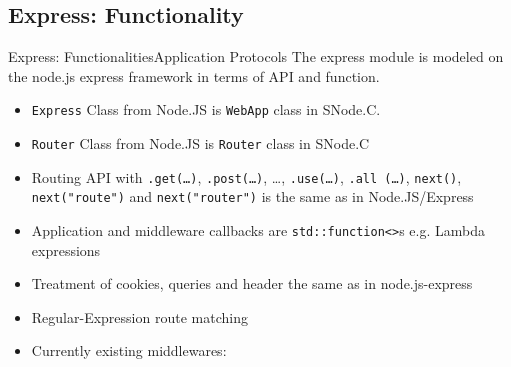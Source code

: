 ﻿\subsection{Express: Functionality}

\begin{frame}{Express: Functionalities}{Application Protocols}
   The express module is modeled on the node.js express framework in terms of API and function.
   \begin{itemize}
     \item \texttt{Express} Class from Node.JS is \texttt{WebApp} class in SNode.C.
     \item \texttt{Router} Class from Node.JS is \texttt{Router} class in SNode.C
     \item Routing API with \texttt{.get(\ldots)}, \texttt{.post(\ldots)}, \ldots, \texttt{.use(\ldots)}, \texttt{.all (\ldots)}, \texttt{next()}, \texttt{next("route")} and \texttt{next("router")} is the same as in Node.JS/Express
     \item \alert{Application} and \alert{middleware} callbacks are \texttt{std::function<>}s e.g. \alert{Lambda} expressions
     \item Treatment of \alert{cookies}, \alert{queries} and \alert{header} the same as in node.js-express
     \item \alert{Regular-Expression} route matching
     \item Currently existing middlewares:
   \end{itemize}
\end{frame}

